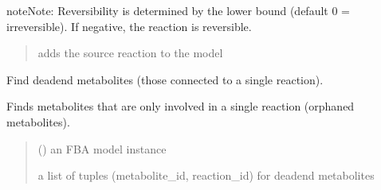 \documentclass[letterpaper,12pt,english]{sphinxmanual}
\begin{document}
\begin{fulllineitems}
\begin{quote}
\begin{description}
\end{description}\end{quote}

\begin{sphinxadmonition}{note}{Note:}
\sphinxAtStartPar
Reversibility is determined by the lower bound (default 0 = irreversible).
If negative, the reaction is reversible.
\end{sphinxadmonition}
\begin{quote}\begin{description}
\sphinxAtStartPar
{} \textendash{} adds the source reaction to the model

\end{description}\end{quote}

\end{fulllineitems}


\begin{fulllineitems}
\label{\detokenize{api/core:cbmpy.CBTools.findDeadEndMetabolites}}
\pysigstartsignatures
\pysiglinewithargsret
{}
{}
{}
\pysigstopsignatures
\sphinxAtStartPar
Find dead\sphinxhyphen{}end metabolites (those connected to a single reaction).

\sphinxAtStartPar
Finds metabolites that are only involved in a single reaction (orphaned metabolites).
\begin{quote}\begin{description}
\sphinxAtStartPar
{} () \textendash{} an FBA model instance

\sphinxAtStartPar
{} \textendash{} a list of tuples (metabolite\_id, reaction\_id) for dead\sphinxhyphen{}end metabolites

\end{description}\end{quote}

\end{fulllineitems}

\end{document}
